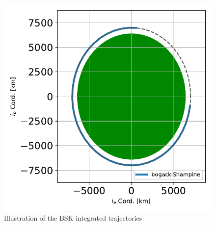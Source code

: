 \begin{figure}[htbp]\centerline{\includegraphics[]{AutoTeX/scenarioIntegrators}}\caption{Illustration of the BSK integrated trajectories}\label{fig:scenarioIntegrators}\end{figure}